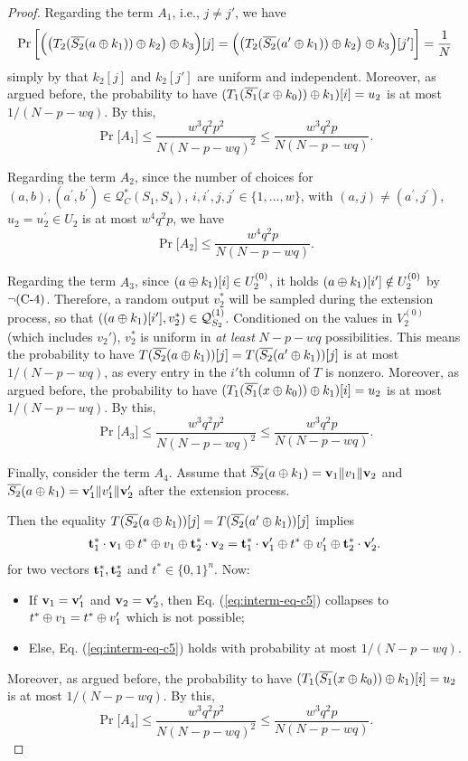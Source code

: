 \begin{proof}
Regarding the term $A_1$, i.e., $j\neq j'$, we have
%
$$\Pr\bigg[\Big(\big(T_2(\overline{S_2}(a\oplus k_1))\oplus k_2\big)\oplus k_3\Big)[j]=\Big(\big(T_2(\overline{S_2}(a'\oplus k_1))\oplus k_2\big)\oplus k_3\Big)[j']\bigg]=\frac{1}{N}$$
simply by that $k_2[j]$ and $k_2[j']$ are uniform and independent. Moreover, as argued before, the probability to have $(T_1(\overline{S_1}(x\oplus k_0))\oplus k_1)[i]=u_2$ is at most $1/(N-p-wq)$. By this,
%
$$\Pr\big[A_1\big]\leq\frac{w^3q^2p^2}{N(N-p-wq)^2}\leq\frac{w^3q^2p}{N(N-p-wq)}.$$



Regarding the term $A_2$, since the number of choices for $(a, b), (a^{\prime}, b^{\prime}) \in \mathcal{Q}_{C}^{*}\left(S_{1}, S_{4}\right)$, $i, i^{\prime},j, j^{\prime} \in\{1, \ldots, w\}$, with $(a, j) \neq \left(a^{\prime}, j^{\prime}\right)$, $u_{2}=u_{2}^{\prime} \in U_{2}$ is at most $w^4q^2p$, we have
%
$$\Pr\big[A_2\big]\leq\frac{w^4q^2p}{N(N-p-wq)}.$$








Regarding the term $A_3$, since $(a\oplus k_1)[i]\in U_2^{(0)}$, it holds $(a\oplus k_1)[i']\notin U_2^{(0)}$ by $\neg\text{(C-4)}$. Therefore, a random output $v_2^*$ will be sampled during the extension process, so that $((a\oplus k_1)[i'],v_2^*)\in\mathcal{Q}_{S_2}^{(1)}$. Conditioned on the values in $V_2^{(0)}$ (which includes $v_2'$), $v_2^*$ is uniform in {\it at least} $N-p-wq$ possibilities. This means the probability to have $T(\overline{S_2}(a\oplus k_1))[j]=T(\overline{S_2}(a'\oplus k_1))[j]$ is at most $1/(N-p-wq)$, as every entry in the $i'$th column of $T$ is nonzero. Moreover, as argued before, the probability to have $(T_1(\overline{S_1}(x\oplus k_0))\oplus k_1)[i]=u_2$ is at most $1/(N-p-wq)$. By this,
%
$$\Pr\big[A_3\big]\leq\frac{w^3q^2p^2}{N(N-p-wq)^2}\leq\frac{w^3q^2p}{N(N-p-wq)}.$$




Finally, consider the term $A_4$. Assume that $\overline{S_2}(a\oplus k_1)=\mathbf{v}_1\|v_1\|\mathbf{v}_2$ and
$\overline{S_2}(a\oplus k_1)=\mathbf{v}_1'\|v_1'\|\mathbf{v}_2'$ after the extension process.

Then the equality $T(\overline{S_2}(a\oplus k_1))[j]=T(\overline{S_2}(a'\oplus k_1))[j]$ implies
%
%
\begin{align}
\mathbf{t}_1^*\cdot\mathbf{v}_1\oplus t^*\oplus v_1\oplus\mathbf{t}_2^*\cdot\mathbf{v}_2=\mathbf{t}_1^*\cdot\mathbf{v}_1'\oplus t^*\oplus v_1'\oplus\mathbf{t}_2^*\cdot\mathbf{v}_2'.
\label{eq:interm-eq-c5}
\end{align}
%
%
for two vectors $\mathbf{t}_1^*,\mathbf{t}_2^*$ and $t^*\in\{0,1\}^n$. Now:
\begin{itemize}
	\item If $\mathbf{v}_1=\mathbf{v}_1'$ and $\mathbf{v}_2=\mathbf{v}_2'$, then Eq. (\ref{eq:interm-eq-c5}) collapses to $t^*\oplus v_1=t^*\oplus v_1'$ which is not possible;
	\item Else, Eq. (\ref{eq:interm-eq-c5}) holds with probability at most $1/(N-p-wq)$.
\end{itemize}
Moreover, as argued before, the probability to have $(T_1(\overline{S_1}(x\oplus k_0))\oplus k_1)[i]=u_2$ is at most $1/(N-p-wq)$. By this,
%
$$\Pr\big[A_4\big]\leq\frac{w^3q^2p^2}{N(N-p-wq)^2}\leq\frac{w^3q^2p}{N(N-p-wq)}.$$
%
%


\end{proof}
